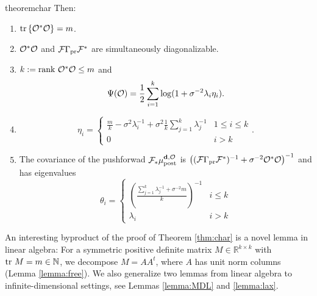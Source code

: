 \begin{restatable}{theorem}{char}
  Then:
  \begin{enumerate}
  \item  $\textup{tr}\left \{\mathcal{O}^*\mathcal{O} \right \} = m$.
  \item $\mathcal{O}^*\mathcal{O}$ and $\mathcal{F}\Gamma_{\textup{pr}}\mathcal{F}^*$ are simultaneously
    diagonalizable.
  \item $k := \textup{rank}\  \mathcal{O}^*\mathcal{O} \leq m$ and
    \begin{equation*}
      \tar(\obs) = \frac12 \sum_{i=1}^{k} \log (1 + \sigma^{-2}\lambda_i\eta_i). %
    \end{equation*}
  \item
    \begin{equation*}
        \eta_i = \begin{cases}
          \frac{m}{k} - \sigma^2 \lambda_i^{-1} + \sigma^2 \frac{1}{k} \sum_{j=1}^k \lambda_j^{-1} & 1 \leq i \leq k \\
          0 & i > k 
        \end{cases}.
    \end{equation*}
  \item The covariance of the pushforwad $\mathcal{F}_{*} \mu_{\textup{post}}^{\mathbf{d}, \mathcal{O}}$ is $\left (
    (\mathcal{F} \Gamma_{\textup{pr}} \mathcal{F}^*)^{-1} + \sigma^{-2} \mathcal{O}^*\mathcal{O} \right )^{-1}$
    and has eigenvalues
    \begin{equation*}
      \theta_i =
      \begin{cases}
        \left(\frac{\sum_{j=1}^k \lambda_j^{-1} + \sigma^{-2}m}{k} \right )^{-1} & i \leq k \\
        \lambda_i &  i > k 
      \end{cases}
    \end{equation*}
  \end{enumerate}
\end{restatable}

An interesting byproduct of the proof of Theorem \ref{thm:char} is a
novel lemma in linear algebra: For a symmetric positive definite
matrix $M \in \mathbb{R}^{k \times k}$ with $\textup{tr}\ M = m \in
\mathbb{N}$, we decompose $M = AA^t$, where $A$ has unit norm columns
(Lemma \ref{lemma:free}). We also generalize two lemmas from linear
algebra to infinite-dimensional settings, see Lemmas \ref{lemma:MDL}
and \ref{lemma:lax}.

